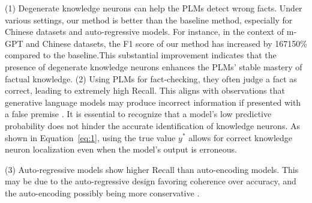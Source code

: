 \documentclass[]{article}
\begin{document}
(1) Degenerate knowledge neurons can help the PLMs detect wrong facts. Under various settings, our method is better than the baseline method, especially for Chinese datasets and auto-regressive models. For instance, in the context of m-GPT and Chinese datasets, the F1 score of our method has increased by 167150\% compared to the baseline.This substantial improvement indicates that the presence of degenerate knowledge neurons enhances the PLMs' stable mastery of factual knowledge.  (2) Using PLMs for fact-checking, they often judge a fact as correct, leading to extremely high Recall. This aligns with observations that generative language models may produce incorrect information if presented with a false premise \cite{hallucination_chatgpt3, lakshmanan2022large, metz2022new}.
It is essential to recognize that a model's low predictive probability does not hinder the accurate identification of knowledge neurons. As shown in Equation~\ref{eq:1}, using the true value \( y^* \) allows for correct knowledge neuron localization even when the model's output is erroneous.


(3) Auto-regressive models show higher Recall than auto-encoding models. This may be due to the auto-regressive design favoring coherence over accuracy, and the auto-encoding possibly being more conservative  \cite{zhou2023comprehensive}.
\end{document}

